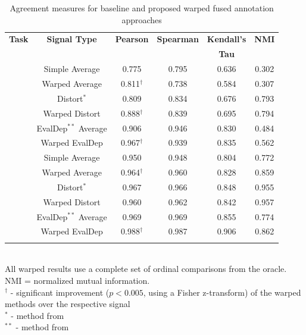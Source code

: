 \documentclass[times,twocolumn,final,authoryear]{elsarticle}
\begin{document}
\setlength\tabcolsep{1pt}
\setlength\extrarowheight{1pt}
\begin{table}[h!]
\caption{\label{tab:results} Agreement measures for baseline and proposed warped fused annotation approaches}
\centering
\begin{tabular}{ cccccc } 
 \Xhline{2\arrayrulewidth}
 \textbf{Task} & \textbf{Signal Type} & \textbf{Pearson} & \textbf{Spearman} & \textbf{Kendall's} & \textbf{NMI} \\
  & & & & \textbf{Tau} & \\
 \Xhline{2\arrayrulewidth}
 \multirow{6}{*}{\textbf{A}} & Simple Average & 0.775 & 0.795 & 0.636 & 0.302 \\ 
 & Warped Average & 0.811$^\dagger$ & 0.738 & 0.584 & 0.307 \\
 \cline{2-6}
 & Distort$^{*}$ & 0.809 & 0.834 & 0.676 & 0.793 \\
 & Warped Distort & 0.888$^\dagger$ & 0.839 & 0.695 & 0.794 \\
 \cline{2-6}
 & EvalDep$^{**}$ Average & 0.906 & 0.946 & 0.830 & 0.484 \\
 & Warped EvalDep & 0.967$^\dagger$ & 0.939 & 0.835 & 0.562 \\
 \Xhline{2\arrayrulewidth}
 \multirow{6}{*}{\textbf{B}} & Simple Average & 0.950 & 0.948 & 0.804 & 0.772 \\ 
 & Warped Average & 0.964$^\dagger$ & 0.960 & 0.828 & 0.859 \\
 \cline{2-6}
 & Distort$^{*}$  & 0.967 & 0.966 & 0.848 & 0.955 \\
 & Warped Distort  & 0.960 & 0.962 & 0.842 & 0.957 \\
 \cline{2-6}
 & EvalDep$^{**}$ Average  & 0.969 & 0.969 & 0.855 & 0.774 \\
 & Warped EvalDep  & 0.988$^\dagger$ & 0.987 & 0.906 & 0.862 \\
 \Xhline{2\arrayrulewidth}
\end{tabular}
\vspace*{4pt} \\
{\footnotesize All warped results use a complete set of ordinal comparisons from the oracle. NMI = normalized mutual information.  \\ $^\dagger$ - significant improvement ($p<0.005$, using a Fisher z-transform) of the warped methods over the respective signal \\ $^{*}$ - method from \cite{Gupta2016} \\ $^{**}$ - method from \cite{Mariooryad2015}}
\end{table}
\end{document}
